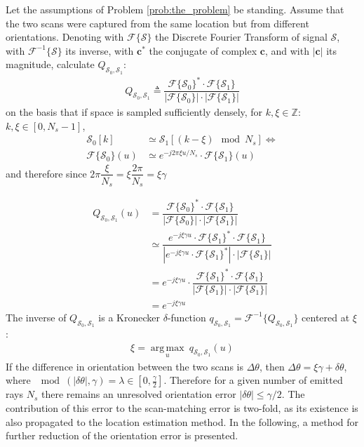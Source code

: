 Let the assumptions of Problem \ref{prob:the_problem} be standing. Assume that
the two scans were captured from the same location but from different
orientations. Denoting with $\mathcal{F}\{\mathcal{S}\}$ the Discrete Fourier
Transform of signal $\mathcal{S}$, with $\mathcal{F}^{-1}\{\mathcal{S}\}$
its inverse, with $\bm{c}^\ast$ the conjugate of complex $\bm{c}$, and with
$|\bm{c}|$ its magnitude, calculate
$Q_{\mathcal{S}_0, \mathcal{S}_1}$:
\begin{align}
  Q_{\mathcal{S}_0, \mathcal{S}_1} \triangleq \dfrac{\mathcal{F}\{\mathcal{S}_0\}^{\ast} \cdot \mathcal{F}\{\mathcal{S}_1\}}{|\mathcal{F}\{\mathcal{S}_0\}| \cdot |\mathcal{F}\{\mathcal{S}_1\}|}
\end{align}
on the basis that if space is sampled sufficiently densely, for
$k,\xi \in \mathbb{Z}$: $k,\xi \in [0, N_s-1]$,
\begin{align}
  \mathcal{S}_0[k] &\simeq \mathcal{S}_1[(k - \xi) \mod N_s] \Leftrightarrow \nonumber \\
  \mathcal{F}\{\mathcal{S}_0\}(u) &\simeq e^{-j 2\pi \xi u / N_s} \cdot \mathcal{F}\{\mathcal{S}_1\}(u) \nonumber
\end{align}
and therefore since $2\pi \dfrac{\xi}{N_s} = \xi \dfrac{2\pi}{N_s} = \xi \gamma$

\begin{align}
  Q_{\mathcal{S}_0, \mathcal{S}_1}(u) &= \dfrac{\mathcal{F}\{\mathcal{S}_0\}^{\ast} \cdot \mathcal{F}\{\mathcal{S}_1\}}{|\mathcal{F}\{\mathcal{S}_0\}| \cdot |\mathcal{F}\{\mathcal{S}_1\}|}  \nonumber \\
  &\simeq \dfrac{e^{-j \xi \gamma  u} \cdot \mathcal{F}\{\mathcal{S}_1\}^\ast \cdot \mathcal{F}\{\mathcal{S}_1\}}{|e^{-j \xi \gamma u} \cdot \mathcal{F}\{\mathcal{S}_1\}^\ast | \cdot | \mathcal{F}\{\mathcal{S}_1\}|} \nonumber \\
  &= e^{-j \xi \gamma u} \cdot \dfrac{\mathcal{F}\{\mathcal{S}_1\}^\ast \cdot \mathcal{F}\{\mathcal{S}_1\}}{|\mathcal{F}\{\mathcal{S}_1\} | \cdot | \mathcal{F}\{\mathcal{S}_1\}|} \nonumber \\
  &= e^{-j \xi \gamma u}
  \label{eq:Q0}
\end{align}
The inverse of $Q_{\mathcal{S}_0, \mathcal{S}_1}$ is a Kronecker
$\delta$-function
$q_{\mathcal{S}_0, \mathcal{S}_1} = \mathcal{F}^{-1}\{Q_{\mathcal{S}_0, \mathcal{S}_1}\}$
centered at $\xi$:
\begin{align}
  \xi = \operatorname*{arg\,max}\limits_u \ q_{\mathcal{S}_0, \mathcal{S}_1}(u)
\end{align}
If the difference in orientation between the two scans is $\Delta\theta$, then
$\Delta\theta = \xi\gamma + \delta\theta$, where
$\mod(|\delta\theta|, \gamma) = \lambda \in [0,\frac{\gamma}{2}]$. Therefore for
a given number of emitted rays $N_s$ there remains an unresolved orientation
error $|\delta\theta| \leq \gamma/2$. The contribution of this error to the
scan-matching error is two-fold, as its existence is also propagated to the
location estimation method. In the following, a method for further reduction of
the orientation error is presented.

